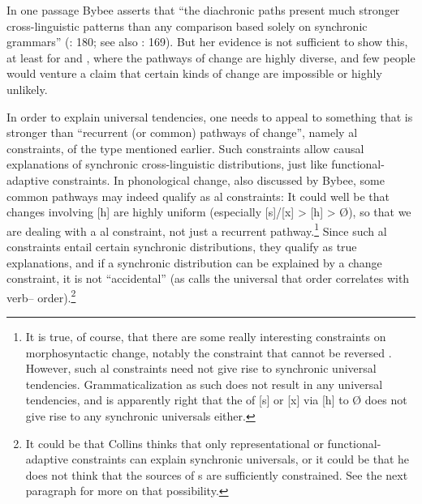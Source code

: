 \documentclass[output=paper]{langsci/langscibook}
\begin{document}
In one passage Bybee asserts that “the diachronic paths present much stronger cross-linguistic patterns than any comparison based solely on synchronic grammars” (\citeyear{Bybee2006}: 180; see also \citealt{Bybee2008}: 169). But her evidence is not sufficient to show this, at least for  and , where the pathways of change are highly diverse, and few people would venture a claim that certain kinds of change are impossible or highly unlikely. 
 
In order to explain universal tendencies, one needs to appeal to something that is stronger than “recurrent (or common) pathways of change”, namely al constraints, of the type mentioned earlier. Such constraints allow causal explanations of synchronic cross-linguistic distributions, just like functional-adaptive constraints. In phonological change, also discussed by Bybee, some common pathways may indeed qualify as al constraints: It could well be that changes involving [h] are highly uniform (especially [s]/[x] > [h] > Ø), so that we are dealing with a al constraint, not just a recurrent pathway.\footnote{It is true, of course, that there are some really interesting constraints on morphosyntactic change, notably the constraint that  cannot be reversed \citep{Haspelmath1999_Irrev}. However, such al constraints need not give rise to synchronic universal tendencies. Grammaticalization as such does not result in any universal tendencies, and \citet[§8]{Bybee2006_Univ} is apparently right that the  of [s] or [x] via [h] to Ø does not give rise to any synchronic universals either.} Since such al constraints entail certain synchronic distributions, they qualify as true explanations, and if a synchronic distribution can be explained by a change constraint, it is not “accidental” (as  calls the universal that  order correlates with verb– order).\footnote{It could be that Collins thinks that only representational or functional-adaptive constraints can explain synchronic universals, or it could be that he does not think that the sources of s are sufficiently constrained. See the next paragraph for more on that possibility.}
 
\end{document}
